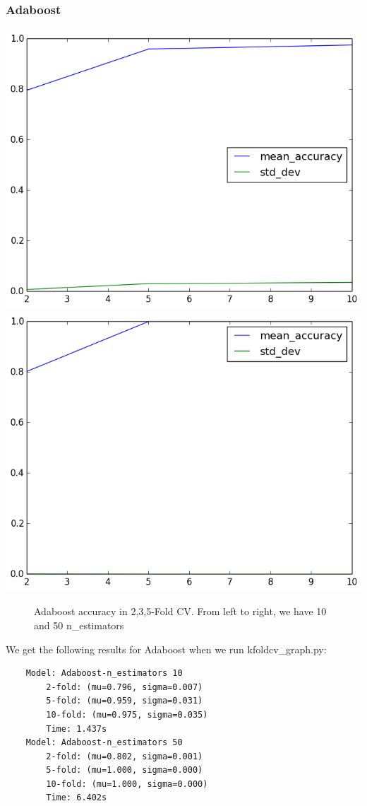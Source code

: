 \documentclass[fleqn]{article}
\begin{document}
    \subsubsection{Adaboost}
    \begin{center}
        \includegraphics[scale=0.3]{model_accuracy_vs_folds_Adaboost-n_estimators10.png}
        \includegraphics[scale=0.3]{model_accuracy_vs_folds_Adaboost-n_estimators50.png}
        \begin{figure}[!h]
            \caption{Adaboost accuracy in 2,3,5-Fold CV. From left to right, we have 10
            and 50 n\_estimators}
        \end{figure}
    \end{center}
    We get the following results for Adaboost when we run kfoldcv\_graph.py:
    \begin{lstlisting}
    Model: Adaboost-n_estimators 10
        2-fold: (mu=0.796, sigma=0.007)
        5-fold: (mu=0.959, sigma=0.031)
        10-fold: (mu=0.975, sigma=0.035)
        Time: 1.437s
    Model: Adaboost-n_estimators 50
        2-fold: (mu=0.802, sigma=0.001)
        5-fold: (mu=1.000, sigma=0.000)
        10-fold: (mu=1.000, sigma=0.000)
        Time: 6.402s
    \end{lstlisting}
\end{document}
